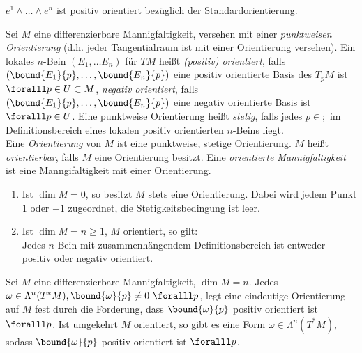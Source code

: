 \begin{exmp*}
	\( e^1 \wedge \dots \wedge e^n \) ist positiv orientiert bezüglich der Standardorientierung.
\end{exmp*}

\begin{defn}
	Sei $M$ eine differenzierbare Mannigfaltigkeit, versehen mit einer \emph{punktweisen Orientierung} (d.h. jeder Tangentialraum ist mit einer Orientierung versehen). Ein lokales $n$-Bein \( (E_1, \dotsc E_n) \) für $TM$ heißt \emph{(positiv) orientiert}, falls \( \left( \bound{E_1}{p}, \dotsc, \bound{E_n}{p} \right) \) eine positiv orientierte Basis des $T_pM$ ist $\foralll p \in U \subset M$, \emph{negativ orientiert}, falls \( \left( \bound{E_1}{p}, \dotsc, \bound{E_n}{p} \right) \) eine negativ orientierte Basis ist $\foralll p \in U$. Eine punktweise Orientierung heißt \emph{stetig}, falls jedes $p \in ;$ im Definitionsbereich eines lokalen positiv orientierten $n$-Beins liegt.\\
	Eine \emph{Orientierung} von $M$ ist eine punktweise, stetige Orientierung. $M$ heißt \emph{orientierbar}, falls $M$ eine Orientierung besitzt. Eine \emph{orientierte Mannigfaltigkeit} ist eine Manngifaltigkeit mit einer Orientierung.
\end{defn}

\begin{rem}
	\begin{enumerate}[label={\roman*})]
		\item Ist \( \dim M = 0 \), so besitzt $M$ stets eine Orientierung. Dabei wird jedem Punkt 1 oder $-1$ zugeordnet, die Stetigkeitsbedingung ist leer.
		\item Ist $\dim M = n \geq 1$, $M$ orientiert, so gilt:\\
			Jedes $n$-Bein mit zusammenhängendem Definitionsbereich ist entweder positiv oder negativ orientiert.
	\end{enumerate}
\end{rem}

\begin{lem}
	Sei $M$ eine differenzierbare Mannigfaltigkeit, $\dim M = n$. Jedes $\omega \in \Lambda^n(T^*M), \bound{\omega}{p} \neq 0 \ \foralll p$, legt eine eindeutige Orientierung auf $M$ fest durch die Forderung, dass \( \bound{\omega}{p} \) positiv orientiert ist $\foralll p$. Ist umgekehrt $M$ orientiert, so gibt es eine Form $\omega \in \Lambda^n(T^*M)$, sodass \( \bound{\omega}{p} \) positiv orientiert ist $\foralll p$.
\end{lem}

